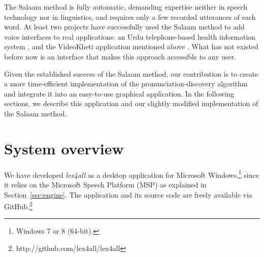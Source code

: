 \documentclass[11pt]{article}
\begin{document}
The Salaam method is fully automatic, demanding expertise neither in speech technology 
nor in linguistics,
and requires only a few recorded utterances of each word.
At least two projects have successfully used the Salaam method to add voice interfaces to real applications: an Urdu telephone-based health information system \cite{Sherwani09}, and
the VideoKheti application mentioned above \cite{bali13}.
What has not existed before now is an interface that makes this approach accessible to any user.

Given the established success of the Salaam method, 
our contribution is to create a more time-efficient implementation of the pronunciation-discovery algorithm and integrate it into an easy-to-use graphical application.
In the following sections, we describe this
application 
and our slightly modified implementation of the Salaam method.


\section{System overview}
\label{sec:overview}

We have developed \textit{lex4all} as a desktop application for Microsoft Windows,\footnote{Windows 7 or 8 (64-bit).} since it relies on the Microsoft Speech Platform (MSP) %
as explained in Section~\ref{sec:engine}.
The application and its source code are freely available 
via GitHub.\footnote{http://github.com/lex4all/lex4all} 

\end{document}
